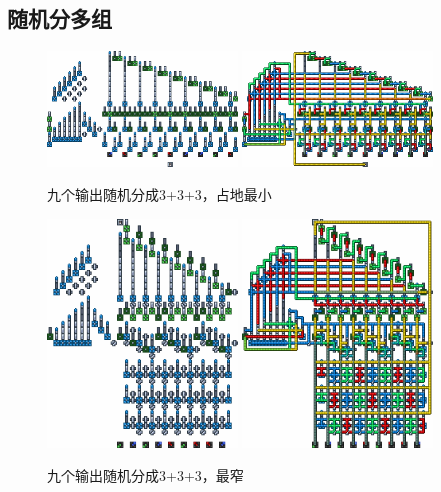 \subsection{随机分多组}
\begin{figure}
    \centering
    \includegraphics[width=0.45\textwidth]{images/148.png}
    \qquad
    \includegraphics[width=0.45\textwidth]{images/149.png}
    \caption{九个输出随机分成3+3+3，占地最小}
\end{figure}
\begin{figure}
    \centering
    \includegraphics[width=0.45\textwidth]{images/146.png}
    \qquad
    \includegraphics[width=0.45\textwidth]{images/147.png}
    \caption{九个输出随机分成3+3+3，最窄}
\end{figure}

